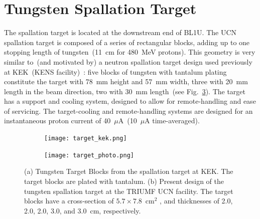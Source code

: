 \section{Tungsten Spallation Target\label{sec:target}}
The spallation target is located at the downstream end of BL1U. The
UCN spallation target is composed of a series of rectangular blocks,
adding up to one stopping length of tungsten~(11~cm for 480~MeV
protons). This geometry is very similar to~(and motivated by) a
neutron spallation target design used previously at KEK~(KENS
facility)~\cite{kawai2001fabrication}: five blocks of tungsten with
tantalum plating constitute the target with 78~mm height and 57~mm
width, three with 20~mm length in the beam direction, two with 30~mm
length~(see Fig.~\ref{fig:target}). The target has a support and
cooling system, designed to allow for remote-handling and ease of
servicing. The target-cooling and remote-handling systems are designed
for an instantaneous proton current of 40~$\mu$A~(10~$\mu$A
time-averaged).

\begin{figure}[h!]
  \centering
  \begin{subfigure}{.5\textwidth}
    \centering
    \texttt{[image: target\_kek.png]}
    \caption{}
    \label{fig:target_kek}
  \end{subfigure}%
  \begin{subfigure}{.5\textwidth}
    \centering
    \texttt{[image: target\_photo.png]}
    \caption{}
    \label{fig:target_photo}
  \end{subfigure}
  \caption[TUCAN's spallation target]{(a) Tungsten Target Blocks from
    the spallation target at KEK. The target blocks are plated with
    tantalum. (b) Present design of the tungsten spallation target at
    the TRIUMF UCN facility. The target blocks have a cross-section of
    $5.7 \times 7.8$~cm$^2$ , and thicknesses of 2.0, 2.0, 2.0, 3.0,
    and 3.0~cm, respectively.}
  \label{fig:target}
\end{figure}

